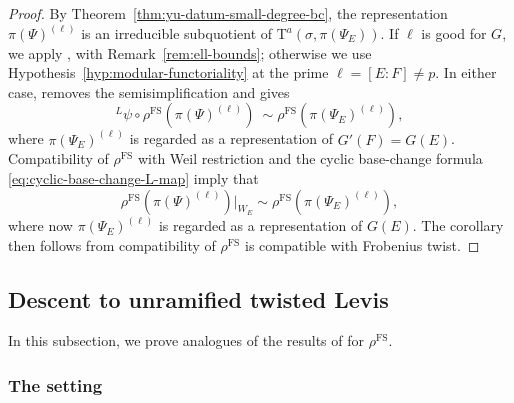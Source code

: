 \documentclass[reqno]{amsart}
\numberwithin{equation}{subsection}
\newcommand{\ld}{{}^L}
\DeclareMathOperator{\FS}{FS}
\newcommand{\rT}{\ensuremath{\mathrm{T}}\xspace}
\theoremstyle{remark}
\numberwithin{equation}{subsection}
\numberwithin{figure}{subsection}
\begin{document}
\begin{proof}
By Theorem~\ref{thm:yu-datum-small-degree-bc}, the representation $\pi(\Psi)^{(\ell)}$ is an irreducible subquotient of $\rT^a(\sigma, \pi(\Psi_E))$. If $\ell$ is good for $G$, we apply \cite[Theorem 1.3.1]{F24}, with Remark~\ref{rem:ell-bounds}; otherwise we use Hypothesis~\ref{hyp:modular-functoriality} at the prime $\ell=[E:F]\neq p$. In either case, \cite[Lemma~10.1.6(1)]{CF26a} removes the semisimplification and gives
\[
\ld \psi \circ \rho^{\FS}(\pi(\Psi)^{(\ell)})\ \sim \rho^{\FS}(\pi(\Psi_E)^{(\ell)}),
\]
where $\pi(\Psi_E)^{(\ell)}$ is regarded as a representation of $G'(F) = G(E)$. Compatibility of $\rho^{\FS}$ with Weil restriction \cite[Theorem I.9.6(vii)]{FS} and the cyclic base-change formula \eqref{eq:cyclic-base-change-L-map} imply that
\[
\rho^{\FS}(\pi(\Psi)^{(\ell)})|_{W_E} \sim \rho^{\FS}(\pi(\Psi_E)^{(\ell)}),
\]
where now $\pi(\Psi_E)^{(\ell)}$ is regarded as a representation of $G(E)$. The corollary then follows from compatibility of $\rho^{\FS}$ is compatible with Frobenius twist. 
\end{proof}


\subsection{Descent to unramified twisted Levis}\label{ss:yu-descent-levi}

In this subsection, we prove analogues of the results of \cite[\S 9]{CF26a} for $\rho^{\FS}$.

\subsubsection{The setting}\label{sss:levi-descent-setting}
\end{document}
